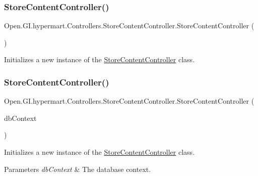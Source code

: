 \subsubsection{\texorpdfstring{Store\+Content\+Controller()}{StoreContentController()}\hspace{0.1cm}{\footnotesize\ttfamily [1/2]}}
{\footnotesize\ttfamily Open.\+G\+I.\+hypermart.\+Controllers.\+Store\+Content\+Controller.\+Store\+Content\+Controller (\begin{DoxyParamCaption}{ }\end{DoxyParamCaption})}



Initializes a new instance of the \hyperlink{class_open_1_1_g_i_1_1hypermart_1_1_controllers_1_1_store_content_controller}{Store\+Content\+Controller} class. 

\hypertarget{class_open_1_1_g_i_1_1hypermart_1_1_controllers_1_1_store_content_controller_ad8b3b3f13892bbb028eb21b7e240d7e2}{}\label{class_open_1_1_g_i_1_1hypermart_1_1_controllers_1_1_store_content_controller_ad8b3b3f13892bbb028eb21b7e240d7e2} 
\subsubsection{\texorpdfstring{Store\+Content\+Controller()}{StoreContentController()}\hspace{0.1cm}{\footnotesize\ttfamily [2/2]}}
{\footnotesize\ttfamily Open.\+G\+I.\+hypermart.\+Controllers.\+Store\+Content\+Controller.\+Store\+Content\+Controller (\begin{DoxyParamCaption}\item[{\hyperlink{interface_open_1_1_g_i_1_1hypermart_1_1_d_a_l_1_1_i_hypermart_context}{I\+Hypermart\+Context}}]{db\+Context }\end{DoxyParamCaption})}



Initializes a new instance of the \hyperlink{class_open_1_1_g_i_1_1hypermart_1_1_controllers_1_1_store_content_controller}{Store\+Content\+Controller} class. 


\begin{DoxyParams}{Parameters}
{\em db\+Context} & The database context.\\
\hline
\end{DoxyParams}


